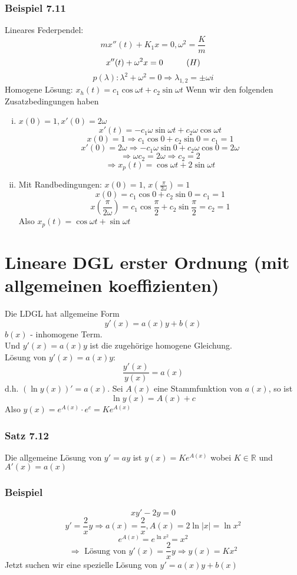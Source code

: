 \subsubsection*{Beispiel 7.11}
Lineares Federpendel:
$$mx''(t)+K_1x=0, \omega^2=\frac{K}{m}$$
$$x''(t)+\omega^2x=0\hspace{10mm}(H)$$
$$p(\lambda):\lambda^2+\omega^2=0\Rightarrow\lambda_{1,2}=\pm\omega i$$
Homogene Lösung: $x_h(t)=c_1\cos\omega t+c_2\sin\omega t$
Wenn wir den folgenden Zusatzbedingungen haben
\begin{enumerate}[(i)]
\item $x(0)=1, x'(0)=2\omega$
$$x'(t)=-c_1\omega\sin\omega t+c_2\omega\cos\omega t$$
$$x(0)=1\Rightarrow c_1\cos 0+c_2\sin 0=c_1=1$$
$$x'(0)=2\omega\Rightarrow-c_1\omega\sin 0+c_2\omega\cos 0=2\omega$$$$\Rightarrow \omega c_2=2\omega\Rightarrow c_2=2$$
$$\Rightarrow x_p(t)=\cos\omega t+2\sin\omega t$$
\item Mit Randbedingungen: $x(0)=1$, $x\left(\frac{\pi}{2\omega}\right)=1$
$$x(0)=c_1\cos 0+c_2\sin 0=c_1=1$$
$$x\left(\frac{\pi}{2\omega}\right)=c_1\cos\frac{\pi}{2}+c_2\sin\frac{\pi}{2}=c_2=1$$
Also $x_p(t)=\cos\omega t+\sin\omega t$
\end{enumerate}

\section{Lineare DGL erster Ordnung (mit allgemeinen koeffizienten)}
Die LDGL hat allgemeine Form $$y'(x)=a(x)y+b(x)$$ $b(x)$ - inhomogene Term.\\

\noindent Und $y'(x)=a(x)y$ ist die zugehörige homogene Gleichung. \\

\noindent Lösung von $y'(x)=a(x)y$: $$\frac{y'(x)}{y(x)}=a(x)$$
d.h. $\left( \ln y(x)\right)'=a(x)$. Sei $A(x)$ eine Stammfunktion von $a(x)$, so ist $$\ln y(x)=A(x)+c$$ Also $y(x)=e^{A(x)}\cdot e^c=Ke^{A(x)}$
\subsubsection*{Satz 7.12} 
Die allgemeine Lösung von $y'=ay$ ist $y(x)=Ke^{A(x)}$ wobei $K\in\mathbb{R}$ und $A'(x)=a(x)$
\subsubsection*{Beispiel}
$$xy'-2y=0$$
$$y'=\frac{2}{x}y\Rightarrow a(x)=\frac{2}{x}, A(x)=2\ln\left|x\right|=\ln x^2$$
$$e^{A(x)}=e^{\ln x^2}=x^2$$
$$\Rightarrow\text{ Lösung von }y'(x)=\frac{2}{x}y \Rightarrow y(x)=Kx^2$$
Jetzt suchen wir eine spezielle Lösung von $y'=a(x)y+b(x)$ 
